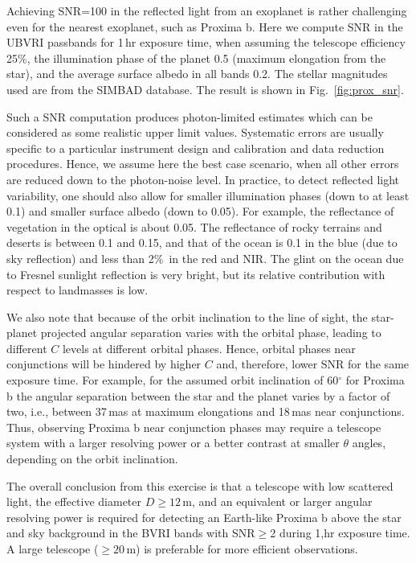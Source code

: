 \documentclass{emulateapj}
\begin{document}
Achieving SNR=100 in the reflected light from an exoplanet 
is rather challenging even for the nearest exoplanet,
such as Proxima b. Here we compute SNR in the UBVRI passbands 
for 1\,hr exposure time, when assuming the telescope efficiency 25\%, 
the illumination phase of the planet 0.5 (maximum elongation from the star),
and the average surface albedo in all bands 0.2. The stellar magnitudes
used are from the SIMBAD database. The result is shown in Fig.~\ref{fig:prox_snr}. 

Such a SNR computation produces photon-limited estimates which can be considered 
as some realistic upper limit values. Systematic errors are usually specific to 
a particular instrument design and calibration and data reduction procedures. 
Hence, we assume here the best case scenario, when all other errors are reduced 
down to the photon-noise level. In practice, to detect
reflected light variability, one should also allow for smaller illumination phases 
(down to at least 0.1) and smaller surface albedo (down to 0.05). For example,
the reflectance of vegetation in the optical is about 0.05.
The reflectance of rocky terrains and deserts is between 0.1 and 0.15, and that
of the ocean is 0.1 in the blue (due to sky reflection) and less than 2\%\ 
in the red and NIR. The glint on the ocean due to Fresnel sunlight reflection
is very bright, but its relative contribution with respect to landmasses
is low. 

We also note that because of the orbit inclination to the line of sight, 
the star-planet projected angular separation varies with the orbital phase,
leading to different $C$ levels at different orbital phases. 
Hence, orbital phases near conjunctions will be hindered by higher $C$ 
and, therefore, lower SNR for the same exposure time. 
For example, for the assumed orbit inclination of 60$^\circ$ for Proxima b
the angular separation between the star and the planet varies
by a factor of two, i.e., 
between 37\,mas at maximum elongations and 18\,mas near conjunctions.
Thus, observing Proxima b near conjunction phases may require a telescope
system with a larger resolving power or a better contrast at smaller
$\theta$ angles, depending on the orbit inclination.

The overall conclusion from this exercise is that a telescope 
with low scattered light, the effective diameter $D\ge12$\,m, 
and an equivalent or larger angular resolving power is required 
for detecting an Earth-like Proxima b above the star and sky 
background in the BVRI bands with SNR$\ge$2 during 1,hr exposure time.
A large telescope ($\ge20$\,m) is preferable
for more efficient observations.
\end{document}
